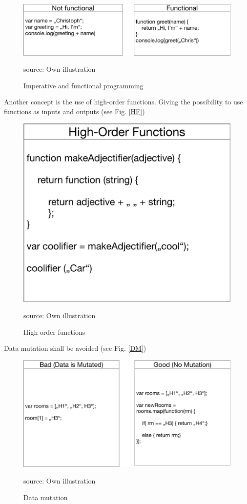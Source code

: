 \begin{figure}[H]
	\centering
	\includegraphics[width=0.8\linewidth]{bilder/grundlagen/fp.png}
	\caption{Imperative and functional programming} source: Own illustration
	\label{fig:FP}
\end{figure}

Another concept is the use of high-order functions. Giving the possibility to use functions as inputs and outputs (see Fig. \ref{HF})


\begin{figure}[H]
	\centering
	\includegraphics[width=0.5\linewidth]{bilder/grundlagen/fp1.png}
	\caption{High-order functions} source: Own illustration
	\label{fig:HF}
\end{figure}

Data mutation shall be avoided (see Fig. \ref{DM})

\begin{figure}[H]
	\centering
	\includegraphics[width=0.8\linewidth]{bilder/grundlagen/fp2.png}
	\caption{Data mutation} source: Own illustration
	\label{fig:DM}
\end{figure}

